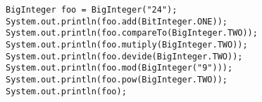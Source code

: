 \documentclass[
  11pt, %
  xcolor=dvipsnames
]{beamer}
\begin{document}
\begin{frame}[fragile]


	\begin{columns}[c]
		\begin{column}{0.9\textwidth}

			\begin{lstlisting}[style=Java]
BigInteger foo = BigInteger("24");
System.out.println(foo.add(BitInteger.ONE));
System.out.println(foo.compareTo(BigInteger.TWO));
System.out.println(foo.mutiply(BigInteger.TWO));
System.out.println(foo.devide(BigInteger.TWO));
System.out.println(foo.mod(BigInteger("9")));
System.out.println(foo.pow(BigInteger.TWO));
System.out.println(foo);
      \end{lstlisting}

		\end{column}
	\end{columns}

\end{frame}
\end{document}
